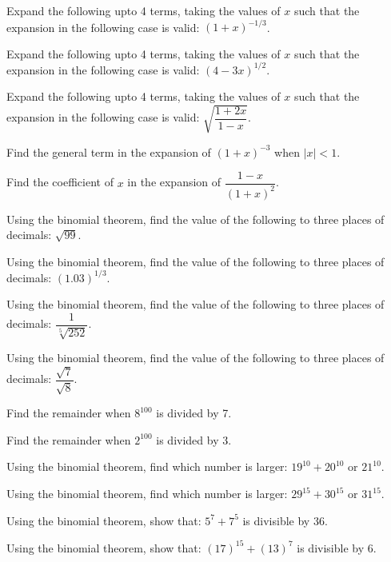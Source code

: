 \documentclass[11pt,a4paper]{article}
\begin{document}
\begin{shortlist}
\item Expand the following upto 4 terms, taking the values of $x$ such that the expansion in the following case is valid: $(1+x)^{-1/3}$.

\item Expand the following upto 4 terms, taking the values of $x$ such that the expansion in the following case is valid: $(4-3x)^{1/2}$.

\item Expand the following upto 4 terms, taking the values of $x$ such that the expansion in the following case is valid: $\sqrt{\dfrac{1+2x}{1-x}}$.

\item Find the general term in the expansion of $(1+x)^{-3}$ when $|x|<1$.

\item Find the coefficient of $x$ in the expansion of $\dfrac{1-x}{(1+x)^2}$.

\item Using the binomial theorem, find the value of the following to three places of decimals: $\sqrt{99}$.

\item Using the binomial theorem, find the value of the following to three places of decimals: $(1.03)^{1/3}$.

\item Using the binomial theorem, find the value of the following to three places of decimals: $\dfrac{1}{\sqrt[5]{252}}$.

\item Using the binomial theorem, find the value of the following to three places of decimals: $\dfrac{\sqrt{7}}{\sqrt{8}}$.

\item Find the remainder when $8^{100}$ is divided by 7.

\item Find the remainder when $2^{100}$ is divided by 3.

\item Using the binomial theorem, find which number is larger: $19^{10}+20^{10}$ or $21^{10}$.

\item Using the binomial theorem, find which number is larger: $29^{15}+30^{15}$ or $31^{15}$.

\item Using the binomial theorem, show that: $5^7+7^5$ is divisible by 36.

\item Using the binomial theorem, show that: $(17)^{15}+(13)^7$ is divisible by 6.


\end{shortlist}
\end{document}
